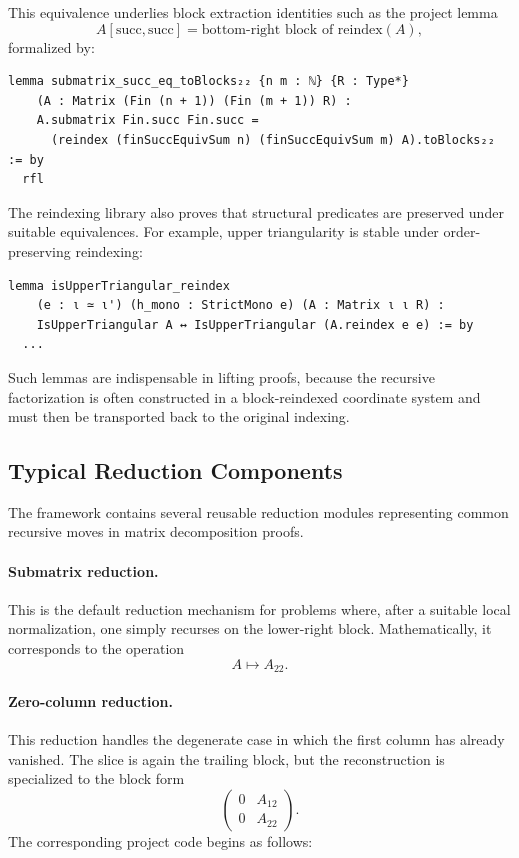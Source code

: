 \documentclass[pdflatex,sn-mathphys-num]{sn-jnl}%
\theoremstyle{thmstyleone}%
\theoremstyle{thmstyletwo}%
\theoremstyle{thmstylethree}%
\begin{document}
This equivalence underlies block extraction identities such as the project lemma
\[
A[\mathrm{succ},\mathrm{succ}] = \text{bottom-right block of } \mathrm{reindex}(A),
\]
formalized by:

\begin{lstlisting}
lemma submatrix_succ_eq_toBlocks₂₂ {n m : ℕ} {R : Type*}
    (A : Matrix (Fin (n + 1)) (Fin (m + 1)) R) :
    A.submatrix Fin.succ Fin.succ =
      (reindex (finSuccEquivSum n) (finSuccEquivSum m) A).toBlocks₂₂ := by
  rfl
\end{lstlisting}

The reindexing library also proves that structural predicates are preserved under suitable equivalences.  For example, upper triangularity is stable under order-preserving reindexing:

\begin{lstlisting}
lemma isUpperTriangular_reindex
    (e : ι ≃ ι') (h_mono : StrictMono e) (A : Matrix ι ι R) :
    IsUpperTriangular A ↔ IsUpperTriangular (A.reindex e e) := by
  ...
\end{lstlisting}

Such lemmas are indispensable in lifting proofs, because the recursive factorization is often constructed in a block-reindexed coordinate system and must then be transported back to the original indexing.

\subsection{Typical Reduction Components}

The framework contains several reusable reduction modules representing common recursive moves in matrix decomposition proofs.

\paragraph{Submatrix reduction.}
This is the default reduction mechanism for problems where, after a suitable local normalization, one simply recurses on the lower-right block.  Mathematically, it corresponds to the operation
\[
A \mapsto A_{22}.
\]

\paragraph{Zero-column reduction.}
This reduction handles the degenerate case in which the first column has already vanished.  The slice is again the trailing block, but the reconstruction is specialized to the block form
\[
\begin{pmatrix}
0 & A_{12}\\
0 & A_{22}
\end{pmatrix}.
\]
The corresponding project code begins as follows:
\end{document}
